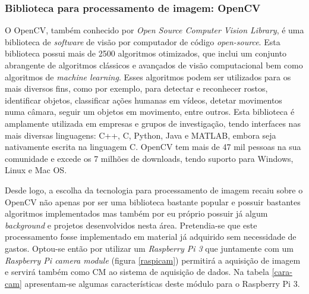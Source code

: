 

\subsubsection{Biblioteca para processamento de imagem: OpenCV}

O OpenCV, também conhecido por \textit{Open Source Computer Vision Library}, é uma biblioteca de \textit{software} de visão por computador de código \textit{open-source}. Esta biblioteca possui mais de 2500 algoritmos otimizados, que inclui um conjunto abrangente de algoritmos clássicos e avançados de visão computacional bem como algoritmos de \textit{machine learning}. Esses algoritmos podem ser utilizados para os mais diversos fins, como por exemplo, para detectar e reconhecer rostos, identificar objetos, classificar ações humanas em vídeos, detetar movimentos numa câmara, seguir um objetos em movimento, entre outros. Esta biblioteca é amplamente utilizada em empresas e grupos de investigação, tendo interfaces nas mais diversas linguagens: C++, C, Python, Java e MATLAB, embora seja nativamente escrita na linguagem C. OpenCV tem mais de 47 mil pessoas na sua comunidade e excede os 7 milhões de downloads, tendo suporto para Windows, Linux e Mac OS\cite{Itseez}.









Desde logo, a escolha da tecnologia para processamento de imagem recaiu sobre o OpenCV não apenas por ser uma biblioteca bastante popular e possuir bastantes algoritmos implementados mas também por eu próprio possuir já algum \textit{background} e projetos desenvolvidos nesta área.  Pretendia-se que este processamento fosse implementado em material já adquirido sem necessidade de gastos. Optou-se então por utilizar um \textit{Raspberry Pi 3} que juntamente com um \textit{Raspberry Pi camera module} (figura \ref{raspicam}) permitirá a aquisição de imagem e servirá também como \acl{CM} ao sistema de aquisição de dados. Na tabela \ref{cara-cam} apresentam-se algumas características deste módulo para o Raspberry Pi 3. 


